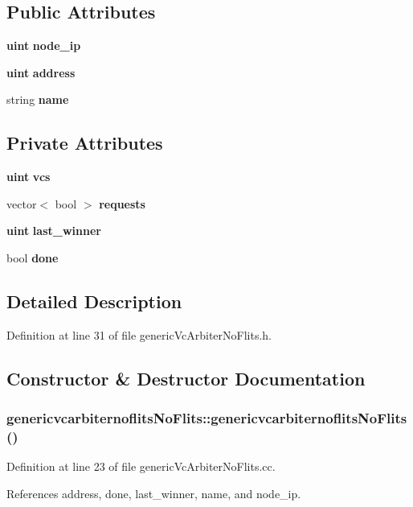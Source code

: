 \subsection*{Public Attributes}
\begin{CompactItemize}
\item 
{\bf uint} {\bf node\_\-ip}
\item 
{\bf uint} {\bf address}
\item 
string {\bf name}
\end{CompactItemize}
\subsection*{Private Attributes}
\begin{CompactItemize}
\item 
{\bf uint} {\bf vcs}
\item 
vector$<$ bool $>$ {\bf requests}
\item 
{\bf uint} {\bf last\_\-winner}
\item 
bool {\bf done}
\end{CompactItemize}


\subsection{Detailed Description}


Definition at line 31 of file genericVcArbiterNoFlits.h.

\subsection{Constructor \& Destructor Documentation}
\subsubsection[{genericvcarbiternoflitsNoFlits}]{\setlength{\rightskip}{0pt plus 5cm}genericvcarbiternoflitsNoFlits::genericvcarbiternoflitsNoFlits ()}\label{classgenericvcarbiternoflitsNoFlits_db66d29bba61a5e4bf3ef5ec5d61ce15}




Definition at line 23 of file genericVcArbiterNoFlits.cc.

References address, done, last\_\-winner, name, and node\_\-ip.
